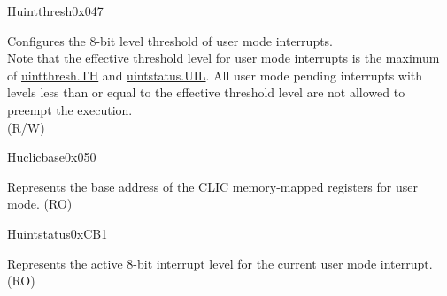 \begin{register}{H}{uintthresh}{0x047}\label{regdesc:UINTTHRESH}
%
%
\regnewline%
\begin{regdesc}\begin{reglist}
\label{fielddesc:UINTTHRESH_TH}\item [TH] Configures the 8-bit level threshold of user mode interrupts. \\
Note that the effective threshold level for user mode interrupts is the maximum of \hyperref[fielddesc:UINTTHRESH_TH]{{uintthresh.TH}} and \hyperref[fielddesc:UINTSTATUS_UIL]{{uintstatus.UIL}}. All user mode pending interrupts with levels less than or equal to the effective threshold level are not allowed to preempt the execution.\\
(R/W)
\end{reglist}\end{regdesc}
\end{register}

\begin{register}{H}{uclicbase}{0x050}\label{regdesc:UCLICBASE_REG}
%
\regnewline%
\begin{regdesc}\begin{reglist}
\label{fielddesc:UCLICBASE}\item [UCLICBASE] Represents the base address of the CLIC memory-mapped registers for user mode. (RO)
\end{reglist}\end{regdesc}
\end{register}


\begin{register}{H}{uintstatus}{0xCB1}
\label{regdesc:UINTSTATUS}
%
%
\regnewline%
\begin{regdesc}\begin{reglist}
\label{fielddesc:UINTSTATUS_UIL}\item [UIL] Represents the active 8-bit interrupt level for the current user mode interrupt. (RO)
\end{reglist}\end{regdesc}
\end{register}


